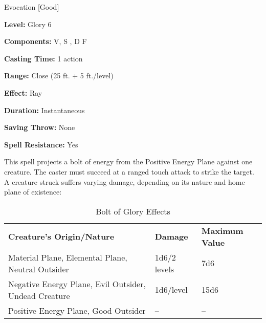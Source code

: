 
Evocation [Good]

\textbf{Level:} Glory 6

\textbf{Components:} V, S , D F

\textbf{Casting Time:} 1 action

\textbf{Range:} Close (25 ft. + 5 ft./level)

\textbf{Effect:} Ray

\textbf{Duration:} Instantaneous

\textbf{Saving Throw:} None

\textbf{Spell Resistance:} Yes

This spell projects a bolt of energy from the Positive Energy Plane against one 
creature. The caster must succeed at a ranged touch attack to strike the target. 
A creature struck suffers varying damage, depending on its nature and home plane 
of existence:

\begin{table}[htb]
\caption{Bolt of Glory Effects}
\centering
\begin{tabular}{l l l}
\textbf{Creature's Origin/Nature} & \textbf{Damage} & \textbf{Maximum Value}\\
Material Plane, Elemental Plane, Neutral Outsider & 1d6/2 levels & 7d6\\
Negative Energy Plane, Evil Outsider, Undead Creature & 1d6/level & 15d6\\
Positive Energy Plane, Good Outsider & -- & --\\
\end{tabular}
\end{table}

